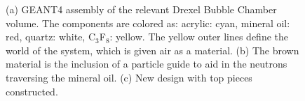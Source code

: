 \documentclass[%
12pt,
twoside,
reprint,
amsmath,amssymb,
aps,
]{article}
\begin{document}
\begin{figure}[H]
		\qquad
		\caption{\label{tab:table-name} (a) GEANT4 assembly of the relevant Drexel Bubble Chamber volume. The components are colored as: acrylic: cyan, mineral oil: red, quartz: white, C$_{3}$F$_{8}$: yellow. The yellow outer lines define the world of the system, which is given air as a material. (b) The brown material is the inclusion of a particle guide to aid in the neutrons traversing the mineral oil. (c) New design with top pieces constructed.}%
	\end{figure}
\end{document}

